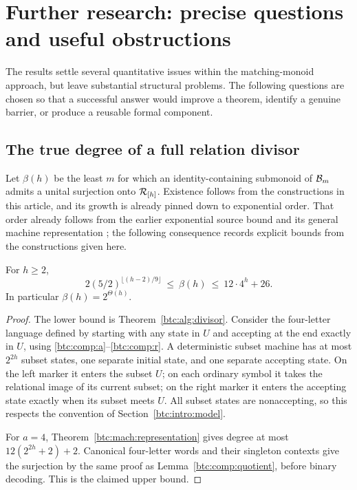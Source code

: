 \section{Further research: precise questions and useful obstructions}
\label{btc:research:section}

The results settle several quantitative issues within the
matching-monoid approach, but leave substantial structural problems.
The following questions are chosen so that a successful answer
would improve a theorem, identify a genuine barrier, or produce
a reusable formal component.

\subsection{The true degree of a full relation divisor}

Let $\beta(h)$ be the least $m$ for which an identity-containing
submonoid of $\mathcal{B}_{m}$ admits a unital surjection onto $\mathcal{R}_{[h]}$.
Existence follows from the constructions in this article, and
its growth is already pinned down to exponential order.
That order already follows from the earlier exponential source
bound and its general machine representation
\cite{OpenAILiveness2026}; the following consequence records
explicit bounds from the constructions given here.

\begin{proposition}\label{btc:research:beta}
For $h\ge2$,
\begin{equation}\label{btc:research:beta-bounds}
 2(5/2)^{\lfloor(h-2)/9\rfloor}
 \ \le\ \beta(h)\ \le\ 12\cdot4^h+26.
\end{equation}
In particular $\beta(h)=2^{\Theta(h)}$.
\end{proposition}

\begin{proof}
The lower bound is Theorem~\ref{btc:alg:divisor}.
Consider the four-letter language defined by starting with any
state in $U$ and accepting at the end exactly in $U$, using
\eqref{btc:comp:a}--\eqref{btc:comp:r}. A deterministic subset machine
has at most $2^{2h}$ subset states, one separate initial state,
and one separate accepting state. On the left marker it enters
the subset $U$; on each ordinary symbol it takes the relational
image of its current subset; on the right marker it enters the
accepting state exactly when its subset meets $U$. All subset
states are nonaccepting, so this respects the convention of
Section~\ref{btc:intro:model}.

For $a=4$, Theorem~\ref{btc:mach:representation} gives degree at most
$12(2^{2h}+2)+2$. Canonical four-letter words and their singleton
contexts give the surjection by the same proof as
Lemma~\ref{btc:comp:quotient}, before binary decoding.
This is the claimed upper bound.
\end{proof}

